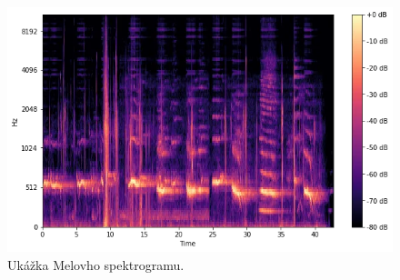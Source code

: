 \begin{figure}[H]
\centerline{\includegraphics[width=1\textwidth]{images/mel_spectrogram.png}}
\caption{Ukážka Melovho spektrogramu.}
\label{fig:mel_spectrogram}
\end{figure}